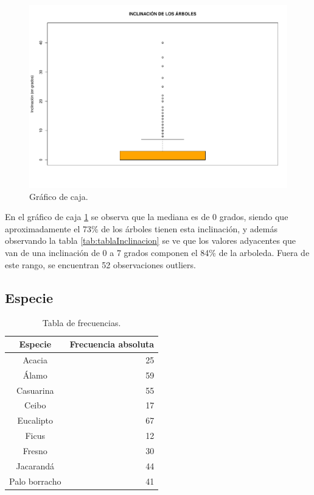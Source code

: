 \documentclass[11pt]{article}
\begin{document}
\begin{figure}[h!]
  \begin{center}
    \includegraphics[width=0.9\linewidth]{boxInclinacion.pdf}
    \caption{Gráfico de caja.}
    \label{fig:boxInclinacion}
  \end{center}  
\end{figure}

\begin{justify}
  En el gráfico de caja \ref{fig:boxInclinacion} se observa que la mediana
  es de 0 grados, siendo que aproximadamente el 73\% de los árboles tienen
  esta inclinación, y además observando la tabla \ref{tab:tablaInclinacion}
  se ve que los valores adyacentes que van de una inclinación de 0 a 7 grados
  componen el 84\% de la arboleda. Fuera de este rango, se encuentran
  52 observaciones outliers. 
\end{justify}


\subsection{Especie}

\begin{table}[h!]
  \begin{center}
    \begin{tabular}{| c | r |}
      \hline
      \textbf{Especie} & \textbf{Frecuencia absoluta} \\ \hline
      Acacia & 25 \\ \hline
      Álamo & 59 \\ \hline
      Casuarina & 55 \\ \hline
      Ceibo & 17 \\ \hline
      Eucalipto & 67 \\ \hline
      Ficus & 12 \\ \hline
      Fresno & 30 \\ \hline
      Jacarandá & 44 \\ \hline
      Palo borracho & 41 \\ \hline
    \end{tabular}
    \caption{Tabla de frecuencias.}
    \label{tab:tablaEspecie}
  \end{center}
\end{table}
\end{document}
